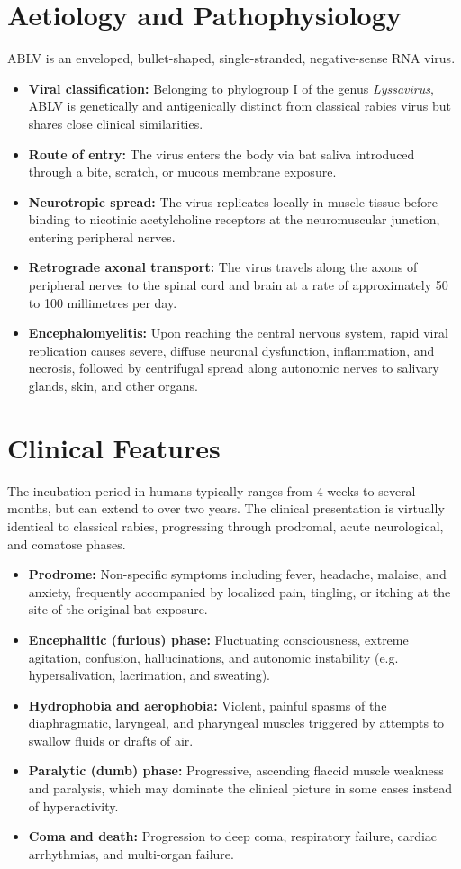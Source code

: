 \section*{Aetiology and Pathophysiology}
ABLV is an enveloped, bullet-shaped, single-stranded, negative-sense RNA virus.
\begin{itemize}
    \item \textbf{Viral classification:} Belonging to phylogroup I of the genus \textit{Lyssavirus}, ABLV is genetically and antigenically distinct from classical rabies virus but shares close clinical similarities.
    \item \textbf{Route of entry:} The virus enters the body via bat saliva introduced through a bite, scratch, or mucous membrane exposure.
    \item \textbf{Neurotropic spread:} The virus replicates locally in muscle tissue before binding to nicotinic acetylcholine receptors at the neuromuscular junction, entering peripheral nerves.
    \item \textbf{Retrograde axonal transport:} The virus travels along the axons of peripheral nerves to the spinal cord and brain at a rate of approximately 50 to 100 millimetres per day.
    \item \textbf{Encephalomyelitis:} Upon reaching the central nervous system, rapid viral replication causes severe, diffuse neuronal dysfunction, inflammation, and necrosis, followed by centrifugal spread along autonomic nerves to salivary glands, skin, and other organs.
\end{itemize}

\section*{Clinical Features}
The incubation period in humans typically ranges from 4 weeks to several months, but can extend to over two years. The clinical presentation is virtually identical to classical rabies, progressing through prodromal, acute neurological, and comatose phases.
\begin{itemize}
    \item \textbf{Prodrome:} Non-specific symptoms including fever, headache, malaise, and anxiety, frequently accompanied by localized pain, tingling, or itching at the site of the original bat exposure.
    \item \textbf{Encephalitic (furious) phase:} Fluctuating consciousness, extreme agitation, confusion, hallucinations, and autonomic instability (e.g. hypersalivation, lacrimation, and sweating).
    \item \textbf{Hydrophobia and aerophobia:} Violent, painful spasms of the diaphragmatic, laryngeal, and pharyngeal muscles triggered by attempts to swallow fluids or drafts of air.
    \item \textbf{Paralytic (dumb) phase:} Progressive, ascending flaccid muscle weakness and paralysis, which may dominate the clinical picture in some cases instead of hyperactivity.
    \item \textbf{Coma and death:} Progression to deep coma, respiratory failure, cardiac arrhythmias, and multi-organ failure.
\end{itemize}

